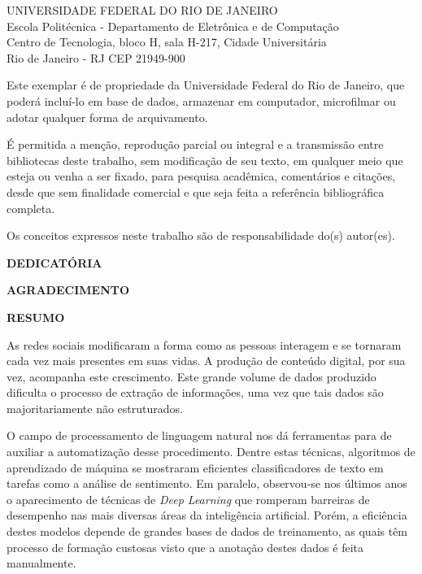 \pagebreak

\vspace{0.5cm}

UNIVERSIDADE FEDERAL DO RIO DE JANEIRO \\
Escola Politécnica - Departamento de Eletrônica e de Computação \\
Centro de Tecnologia, bloco H, sala H-217, Cidade Universitária \\
Rio de Janeiro - RJ      CEP 21949-900\\
\vspace{0.5cm}

Este exemplar é de propriedade da Universidade Federal do Rio de Janeiro, que poderá incluí-lo em base de dados, armazenar em computador, microfilmar ou adotar qualquer forma de arquivamento.

É permitida a menção, reprodução parcial ou integral e a transmissão entre bibliotecas deste trabalho, sem modificação de seu texto, em qualquer meio que esteja ou venha a ser fixado, para pesquisa acadêmica, comentários e citações, desde que sem finalidade comercial e que seja feita a referência bibliográfica completa.

Os conceitos expressos neste trabalho são de responsabilidade do(s) autor(es).

\pagebreak

\begin{center}
\textbf{DEDICATÓRIA}
\end{center}
\vspace{0.5cm}

\pagebreak


\begin{center}
\textbf{AGRADECIMENTO}
\end{center}
\vspace{0.5cm}

\pagebreak

\begin{center}
\textbf{RESUMO}
\end{center}
\vspace{0.5cm}

As redes sociais modificaram a forma como as pessoas interagem e se tornaram cada vez mais presentes em suas vidas.
A produção de conteúdo digital, por sua vez, acompanha este crescimento.
Este grande volume de dados produzido dificulta o processo de extração de informações, uma vez que tais dados são
majoritariamente não estruturados.

O campo de processamento de linguagem natural nos dá ferramentas para de auxiliar a automatização desse procedimento.
Dentre estas técnicas, algoritmos de aprendizado de máquina se mostraram eficientes classificadores de texto em tarefas
como a análise de sentimento.
Em paralelo, observou-se nos últimos anos o aparecimento de técnicas de \textit{Deep Learning} que romperam barreiras
de desempenho nas mais diversas áreas da inteligência artificial.
Porém, a eficiência destes modelos depende de grandes bases de dados de treinamento, as quais têm processo de formação
custosas visto que a anotação destes dados é feita manualmente.

